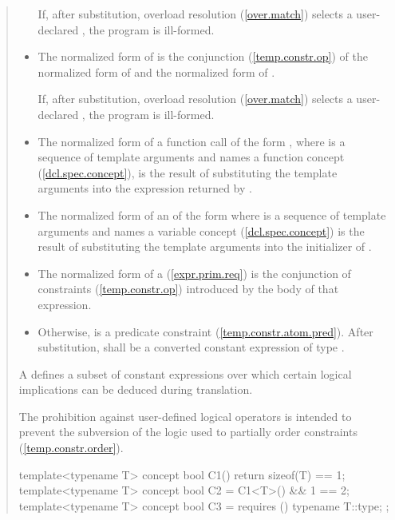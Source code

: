 \begin{quote}
\begin{itemize}
If, after substitution, overload resolution 
(\ref{over.match}) selects a user-declared 
, the program is ill-formed.

\item The normalized form of  is
the conjunction (\ref{temp.constr.op}) of the 
normalized form of  and the normalized form of
.

If, after substitution, overload resolution 
(\ref{over.match}) selects a user-declared 
, the program is ill-formed.

\item The normalized form of a function call of the form
,
where 
is a sequence of template arguments and  names a function
concept (\ref{dcl.spec.concept}), is the result of 
substituting the template arguments into the expression
returned by .

\item The normalized form of an 
of the form 
where 
is a sequence of template arguments and  names a variable
concept (\ref{dcl.spec.concept}) is the result of 
substituting the template arguments into the initializer
of .

\item The normalized form of a 
(\ref{expr.prim.req}) is
the conjunction of constraints (\ref{temp.constr.op}) 
introduced by the body of that expression.


\item Otherwise,  is a predicate constraint 
(\ref{temp.constr.atom.pred}). 
% 
After substitution,  shall be a converted constant 
expression of type .

\end{itemize}


\enternote
A  defines a subset of constant 
expressions over which certain logical implications can be deduced during 
translation.

The prohibition against user-defined logical operators is intended to
prevent the subversion of the logic used to partially order 
constraints (\ref{temp.constr.order}).
\exitnote

\enterexample
\begin{codeblock}
template<typename T> concept bool C1() { return sizeof(T) == 1; }
template<typename T> concept bool C2 = C1<T>() && 1 == 2;
template<typename T> concept bool C3 = requires () { typename T::type; };


\end{codeblock}
\end{quote}
